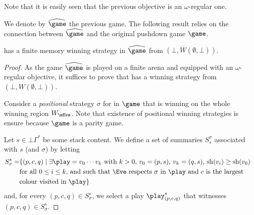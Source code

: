 Note that it is easily seen that the previous objective is an $\omega$-regular one. 


We denote by $\hgame$ the previous game. The following result relies on the connection between $\hgame$ and the original pushdown game $\game$.

\begin{theorem}\label{11-thm:hgame}
	\Eve has a finite memory winning strategy in $\hgame$ from $(\bot,W(\emptyset,\bot))$.
\end{theorem}

\begin{proof}
	As the game $\hgame$ is played on a finite arena and equipped with an $\omega$-regular objective, it suffices to prove that \Eve has a winning strategy from $(\bot,W(\emptyset,\bot))$.

	Consider a \emph{positional} strategy $\sigma$ for \Eve in $\game$ that is winning on the whole winning region $W_\mEve$. Note that existence of positional winning strategies is ensure because $\game$ is a parity game.
	
	Let $s\in\bot\Gamma^*$ be some stack content. We define a set of summaries $S_s^\sigma$ associated with $s$ (and $\sigma$) by letting 
	\begin{equation*}
	\begin{split}
	S^s_\sigma=& \{(p,c,q) \mid \exists \play=v_0\cdots v_k \text{ with $k>0$, $v_0=(p,s)$, $v_k=(q,s)$, $\sh(v_i)\geq \sh(v_0)$ }\\  & \text{for all $0\leq i\leq k$, and such that \Eve respects $\sigma$ in $\play$ and $c$ is the largest}\\ & \text{colour visited in $\play$}\}
	\end{split}
	\end{equation*}	
	and, for every $(p,c,q)\in S^s_\sigma$, we select a play $\play_{(p,c,q)}^s$ that witnesses $(p,c,q)\in S_\sigma^s$. 
	

\end{proof}
